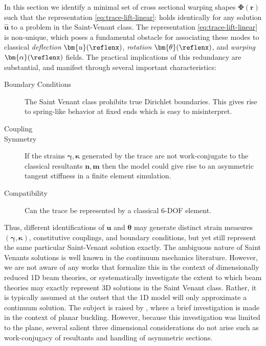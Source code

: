 In this section we identify a minimal set of cross sectional warping shapes \(\bm{\Phi}(\bm{r})\) such that the representation \eqref{eq:trace-lift-linear}:
holds identically for any solution \(\hat{\bm u}\) to a problem in the Saint-Venant class. 
The representation \eqref{eq:trace-lift-linear} is non-unique, which
poses a fundamental obstacle for associating these modes to classical \emph{deflection} \(\bm{u}(\reflenx)\), \emph{rotation} \(\bm{\theta}(\reflenx)\), and \emph{warping} \(\bm{\alpha}(\reflenx)\) fields. 
The practical implications of this redundancy are substantial, and manifest through several important characteristics:
\begin{description}
    \item[Boundary Conditions] The Saint Venant class prohibits true Dirichlet boundaries. This gives rise to spring-like behavior at fixed ends which is easy to misinterpret. 
    \item[Coupling] 
    \item[Symmetry] If the strains \(\bm\gamma,\bm\kappa\) generated by the trace are not work-conjugate to the classical resultants \(\bm{n},\bm{m}\) then the model could give rise to an asymmetric tangent stiffness in a finite element simulation. 
    \item[Compatibility] Can the trace be represented by a classical 6-DOF element.
\end{description}
Thus, different identifications of \(\bm{u}\) and \(\bm{\theta}\) may generate distinct  strain measures 
$(\bm{\gamma}, \bm{\kappa})$, constitutive couplings, and boundary conditions, but yet still represent the same particular Saint-Venant solution exactly. 
The ambiguous nature of Saint Venants solutions is well known in the continuum mechanics literature. 
However, we are not aware of any works that formalize this in the context of dimensionally reduced 1D beam theories, or systematically investigate the extent to which beam theories may exactly represent 3D solutions in the Saint Venant class. 
Rather, it is typically assumed at the outset that the 1D model will only approximate a continuum solution. 
The subject is raised by \cite{simo1982bifurcation}, where a brief investigation is made in the context of planar buckling. 
However, because this investigation was limited to the plane, several salient three dimensional considerations do not arise such as work-conjugacy of resultants and handling of asymmetric sections. 



